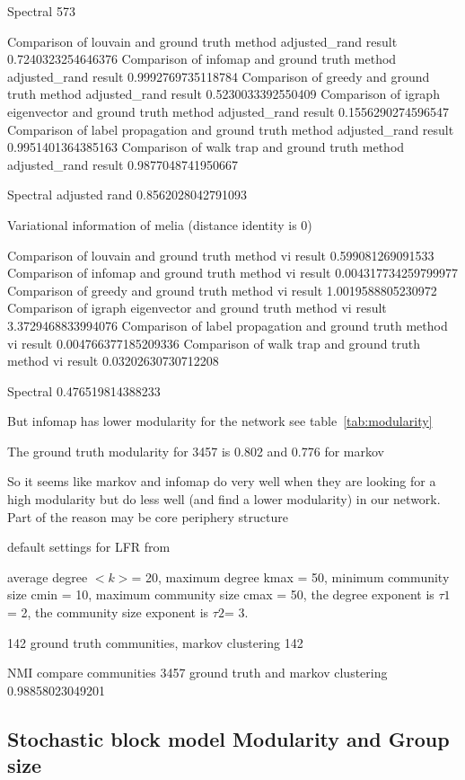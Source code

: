 Spectral 573

Comparison of louvain and ground truth method adjusted\_rand result 0.7240323254646376
Comparison of infomap and ground truth method adjusted\_rand result 0.9992769735118784
Comparison of greedy and ground truth method adjusted\_rand result 0.5230033392550409
Comparison of igraph eigenvector and ground truth method adjusted\_rand result 0.1556290274596547
Comparison of label propagation and ground truth method adjusted\_rand result 0.9951401364385163
Comparison of walk trap and ground truth method adjusted\_rand result 0.9877048741950667


Spectral adjusted rand
0.8562028042791093

Variational information of melia (distance identity is 0)

Comparison of louvain and ground truth method vi result 0.599081269091533
Comparison of infomap and ground truth method vi result 0.004317734259799977
Comparison of greedy and ground truth method vi result 1.0019588805230972
Comparison of igraph eigenvector and ground truth method vi result 3.3729468833994076
Comparison of label propagation and ground truth method vi result 0.004766377185209336
Comparison of walk trap and ground truth method vi result 0.03202630730712208

Spectral 
0.476519814388233


But infomap has lower modularity for the network see table~\ref{tab:modularity}


The ground truth modularity for 3457 is 0.802 and 0.776 for markov

So it seems like markov and infomap do very well when they are looking for a high modularity but do less well (and find a lower modularity) in our network. Part of the reason may be core periphery structure


default settings for LFR from  \cite{lancichinetti2012consensus}

average degree $<k>$= 20, maximum degree kmax = 50, minimum community size cmin = 10, maximum community size cmax = 50, the degree exponent is $\tau1$ = 2, the community size exponent is $\tau2$= 3. 

142 ground truth communities, markov clustering 142

NMI compare communities 3457 ground truth and markov clustering 0.98858023049201

\subsection{Stochastic block model Modularity and Group size}

